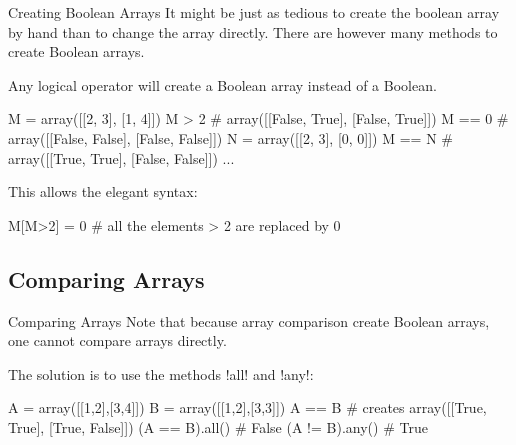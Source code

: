 \documentclass[hyperref={pdfpagelabels=false},table]{beamer}
\begin{document}
\begin{frame}[fragile]{Creating Boolean Arrays}
It might be just as tedious to create the boolean array by hand than to change the array directly. There are however many methods to create Boolean arrays.

Any \alert{logical operator} will create a Boolean array instead of a Boolean.

\begin{python}
M = array([[2, 3], [1, 4]])
M > 2 # array([[False, True], [False, True]])
M == 0 # array([[False, False], [False, False]])
N = array([[2, 3], [0, 0]])
M == N # array([[True, True], [False, False]])
...
\end{python}

This allows the elegant syntax:
\begin{python}
M[M>2] = 0
# all the elements > 2 are replaced by 0
\end{python}
\end{frame}

\subsection{Comparing Arrays}

\begin{frame}[fragile]{Comparing Arrays}
Note that because array comparison create Boolean arrays, \alert{one cannot compare arrays directly}.


The solution is to use the methods \pyth!all! and \pyth!any!:
\begin{python}
A = array([[1,2],[3,4]])
B = array([[1,2],[3,3]])
A == B # creates array([[True, True], [True, False]])
(A == B).all() # False
(A != B).any() # True
\end{python}
\end{frame}
\end{document}
